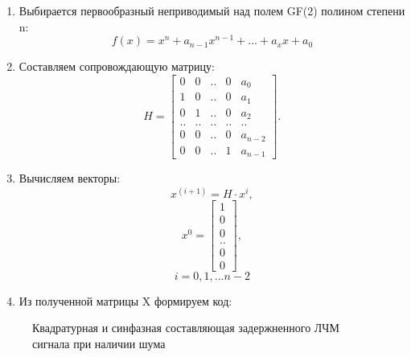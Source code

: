\begin{enumerate}
    \item Выбирается первообразный неприводимый над полем GF(2) полином степени n:
    \begin{equation}
    f(x) = x^{n} + a_{n-1}x^{n-1} + ... + a_{x}x + a_{0}
    \end{equation}
    \item Составляем сопровождающую матрицу:
    \begin{equation} 
    H = 
        \begin{bmatrix}
            0 & 0 & .. & 0 & a_{0}\\
            1 & 0 & .. & 0 & a_{1}\\
            0 & 1 & .. & 0 & a_{2}\\
            .. & .. & .. & .. & ..\\
            0 & 0 & .. & 0 & a_{n-2}\\
            0 & 0 & .. & 1 & a_{n-1}
        \end{bmatrix}.
    \end{equation}
    \item Вычисляем векторы:
    \begin{equation}
        x^{(i + 1)} = H \cdot x^{i}, 
    \end{equation}
    \begin{equation}
        x^{0} =
        \begin{bmatrix}
            1 \\
            0 \\
            0 \\
            ..\\
            0 \\
            0 
        \end{bmatrix}, 
    \end{equation}
    \begin{equation}
        i = 0, 1, ... n - 2
    \end{equation}
    \item Из полученной матрицы X формируем код:
\end{enumerate}

\begin{figure}[h]
    \centering
    \noindent
    \caption{Квадратурная и синфазная составляющая задержненного ЛЧМ сигнала при наличии шума}
    \label{fig:chirp_shift_noise}
\end{figure}

